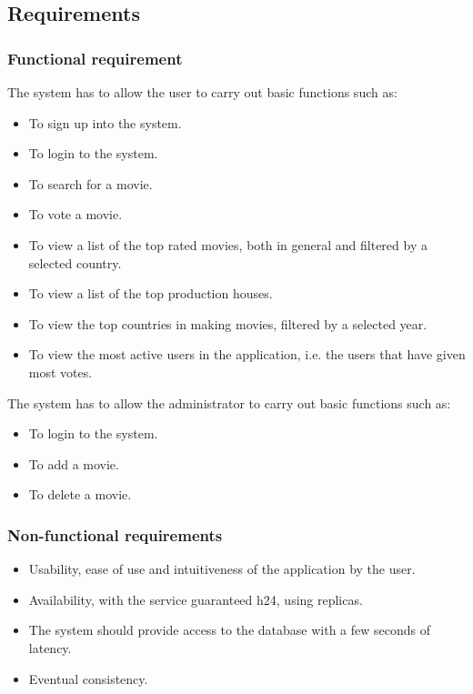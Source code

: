 \documentclass[a4paper, oneside]{article}
\begin{document}
\subsection{Requirements}

\subsubsection{Functional requirement}
The system has to allow the user to carry out basic functions such as:
\begin{itemize}
\item To sign up into the system.
\item To login to the system.
\item To search for a movie.
\item To vote a movie.
\item To view a list of the top rated movies, both in general and filtered by a selected country.
\item To view a list of the top production houses.
\item To view the top countries in making movies, filtered by a selected year.
\item To view the most active users in the application, i.e. the users that have given most votes.
\end{itemize}
\vspace{2mm}
The system has to allow the administrator to carry out basic functions such as:
\begin{itemize}
\item To login to the system.
\item To add a movie.
\item To delete a movie.
\end{itemize}
\vspace{2mm}

\subsubsection{Non-functional requirements}
\begin{itemize}
\item Usability, ease of use and intuitiveness of the application by the user.
\item Availability, with the service guaranteed h24, using replicas.
\item The system should provide access to the database with a few seconds of latency.
\item Eventual consistency.
\end{itemize}
\end{document}
